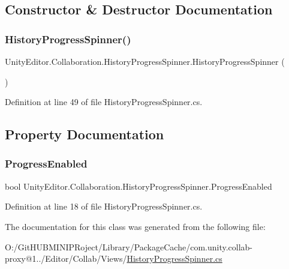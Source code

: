 \subsection{Constructor \& Destructor Documentation}
\mbox{\label{class_unity_editor_1_1_collaboration_1_1_history_progress_spinner_abada509162abb1a4fcb5185a447fba74}} 
\subsubsection{\texorpdfstring{HistoryProgressSpinner()}{HistoryProgressSpinner()}}
{\footnotesize\ttfamily Unity\+Editor.\+Collaboration.\+History\+Progress\+Spinner.\+History\+Progress\+Spinner (\begin{DoxyParamCaption}{ }\end{DoxyParamCaption})}



Definition at line 49 of file History\+Progress\+Spinner.\+cs.



\subsection{Property Documentation}
\mbox{\label{class_unity_editor_1_1_collaboration_1_1_history_progress_spinner_a61407917e1acad9a8ea2319e0c3d6977}} 
\subsubsection{\texorpdfstring{ProgressEnabled}{ProgressEnabled}}
{\footnotesize\ttfamily bool Unity\+Editor.\+Collaboration.\+History\+Progress\+Spinner.\+Progress\+Enabled\hspace{0.3cm}{\ttfamily [set]}}



Definition at line 18 of file History\+Progress\+Spinner.\+cs.



The documentation for this class was generated from the following file\+:\begin{DoxyCompactItemize}
\item 
O\+:/\+Git\+H\+U\+B\+M\+I\+N\+I\+P\+Roject/\+Library/\+Package\+Cache/com.\+unity.\+collab-\/proxy@1../\+Editor/\+Collab/\+Views/\mbox{\hyperlink{_history_progress_spinner_8cs}{History\+Progress\+Spinner.\+cs}}\end{DoxyCompactItemize}
